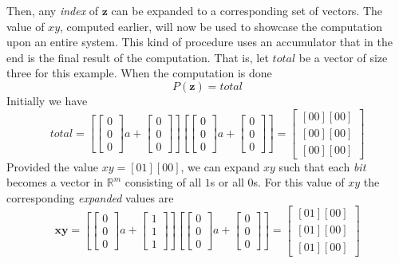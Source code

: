 Then, any \emph{index} of $\textbf{z}$ can be expanded to a corresponding set of vectors. The value of $xy$, computed earlier, will now be used to showcase the computation upon an entire system. This kind of procedure uses an accumulator that in the end is the final result of the computation. That is, let $total$ be a vector of size three for this example. When the computation is done
$$
    P(\textbf{z}) = total
$$
Initially we have 
$$
    total = 
    [
    \begin{bmatrix}
        0\\
        0\\
        0
    \end{bmatrix}a
    + 
    \begin{bmatrix}
        0\\
        0\\
        0
    \end{bmatrix} ]
    [
    \begin{bmatrix}
        0\\
        0\\
        0
    \end{bmatrix}a
    + 
    \begin{bmatrix}
        0\\
        0\\
        0
    \end{bmatrix} 
    ] = \begin{bmatrix}
        [00][00]\\
        [00][00]\\
        [00][00]
    \end{bmatrix} 
$$
Provided the value $xy = [01][00]$, we can expand $xy$ such that each \textit{bit} becomes a vector in $\mathbb{R}^m$ consisting of all $1$s or all $0$s. For this value of $xy$ the corresponding \textit{expanded} values are
$$
    \textbf{xy} = 
    [
    \begin{bmatrix}
        0\\
        0\\
        0
    \end{bmatrix}a
    + 
    \begin{bmatrix}
        1\\
        1\\
        1
    \end{bmatrix} ]
    [
    \begin{bmatrix}
        0\\
        0\\
        0
    \end{bmatrix}a
    + 
    \begin{bmatrix}
        0\\
        0\\
        0
    \end{bmatrix} 
    ] = \begin{bmatrix}
        [01][00]\\
        [01][00]\\
        [01][00]
    \end{bmatrix} 
$$
